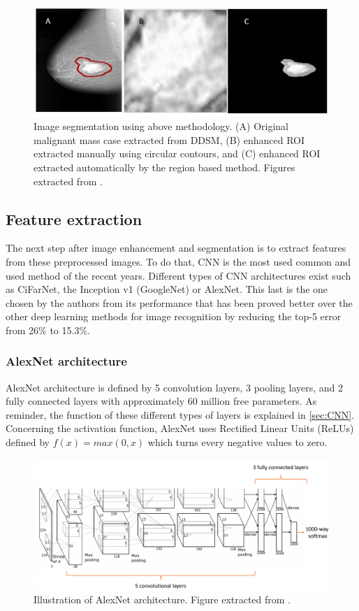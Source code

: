 \documentclass[11pt, openany]{report}
\theoremstyle{plain}
\theoremstyle{definition}
\theoremstyle{remark}
\begin{document}
\begin{figure}[h]
  \centering
  \includegraphics[scale=0.6]{figures/image-segmentation.png}
  \caption{Image segmentation using above methodology. (A) Original malignant mass case extracted from DDSM, (B) enhanced ROI extracted manually using circular contours, and (C) enhanced ROI extracted automatically by the region based method. Figures extracted from \cite{breast-cancer}.}
  \label{fig:image-segmentation}
\end{figure}


\subsection{Feature extraction}
The next step after image enhancement and segmentation is to extract features from these preprocessed images. To do that, CNN is the most used common and used method of the recent years. Different types of CNN architectures exist such as CiFarNet, the Inception v1 (GoogleNet) or AlexNet. This last is the one chosen by the authors from its performance that has been proved better over the other deep learning methods for image recognition by reducing the top-5 error from 26\% to 15.3\%. 

\subsubsection{AlexNet architecture}
AlexNet architecture is defined by 5 convolution layers, 3 pooling layers, and 2 fully connected layers with approximately 60 million free parameters. As reminder, the function of these different types of layers is explained in \autoref{sec:CNN}. Concerning the activation function, AlexNet uses Rectified Linear Units (ReLUs) defined by $f(x) = max(0, x)$ which turns every negative values to zero. 

\begin{figure}[h]
  \centering
  \includegraphics[scale=0.47]{figures/AlexNet.png}
  \caption{Illustration of AlexNet architecture. Figure extracted from \cite{AlexNet}.}
  \label{fig:image-segmentation}
\end{figure}
\end{document}
